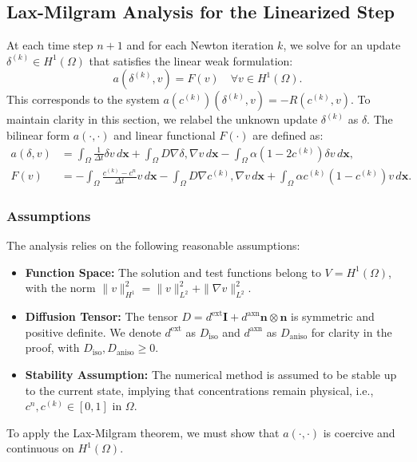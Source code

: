 \documentclass[12pt, a4paper, twoside, openright]{report}
\begin{document}
\subsection{Lax-Milgram Analysis for the Linearized Step}
At each time step $n+1$ and for each Newton iteration $k$, we solve for an update $\delta^{(k)} \in H^1(\Omega)$ that satisfies the linear weak formulation:
\[
a(\delta^{(k)}, v) = F(v) \quad \forall v \in H^1(\Omega).
\]
This corresponds to the system $a(c^{(k)})(\delta^{(k)}, v) = -R(c^{(k)}, v)$. To maintain clarity in this section, we relabel the unknown update $\delta^{(k)}$ as $\delta$. The bilinear form $a(\cdot, \cdot)$ and linear functional $F(\cdot)$ are defined as:
\begin{align*}
a(\delta, v) &= \int_{\Omega} \frac{1}{\Delta t} \delta v \, d\mathbf{x} + \int_{\Omega}   D \nabla \delta, \nabla v   \, d\mathbf{x} - \int_{\Omega} \alpha (1 - 2 c^{(k)}) \delta v \, d\mathbf{x}, \\
F(v) &= -\int_{\Omega} \frac{c^{(k)} - c^n}{\Delta t} v \, d\mathbf{x} - \int_{\Omega}   D \nabla c^{(k)}, \nabla v   \, d\mathbf{x} + \int_{\Omega} \alpha c^{(k)} (1 - c^{(k)}) v \, d\mathbf{x}.
\end{align*}

\subsubsection{Assumptions}
The analysis relies on the following reasonable assumptions:
\begin{itemize}
    \item \textbf{Function Space:} The solution and test functions belong to $V = H^1(\Omega)$, with the norm $\|v\|_{H^1}^2 = \|v\|_{L^2}^2 + \|\nabla v\|_{L^2}^2$.
    \item \textbf{Diffusion Tensor:} The tensor $D = d^{\text{ext}} \mathbf{I} + d^{\text{axn}} \mathbf{n} \otimes \mathbf{n}$ is symmetric and positive definite. We denote $d^{\text{ext}}$ as $D_{\text{iso}}$ and $d^{\text{axn}}$ as $D_{\text{aniso}}$ for clarity in the proof, with $D_{\text{iso}}, D_{\text{aniso}} \ge 0$.
    \item \textbf{Stability Assumption:} The numerical method is assumed to be stable up to the current state, implying that concentrations remain physical, i.e., $c^n, c^{(k)} \in [0, 1]$ in $\Omega$.
\end{itemize}
To apply the Lax-Milgram theorem, we must show that $a(\cdot, \cdot)$ is coercive and continuous on $H^1(\Omega)$.
\end{document}
